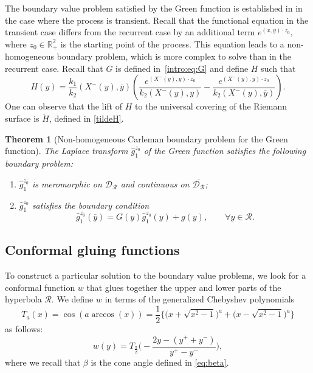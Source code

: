 \documentclass[11pt]{article}
\newcommand\citeS[1]{\cite{#1}}
\newcommand{\R}{\mathcal{R}}
\newcommand{\G}{\mathcal{D}_\mathcal{R}}
\newtheorem{theorem}[thm]{Theorem}
\theoremstyle{definition}
\begin{document}
The boundary value problem satisfied by the Green function is established in \citeS{franceschi_green_2021} in the case where the process is transient. 
Recall that the functional equation in the transient case
differs from the recurrent case by an additional term $e^{(x,y) \cdot z_0}$, where $z_0\in\mathbb{R}_+^2$ is the starting point of the process.
This equation leads to a non-homogeneous boundary problem, which is more complex to solve than in the recurrent case. 
Recall that $G$ is defined in~\eqref{intro:eq:G}
and define $H$ such that
$$
H(y)=
\frac{k_1}{k_2} {(X^-(y),\overline{y})}
\left(
\frac{e^{(X^-(y),y) \cdot z_0}}{k_2(X^-(y),y)}
-
\frac{e^{(X^-(y),\overline{y})\cdot z_0}}{k_2(X^-(y),\overline{y})}
\right) .
$$
One can observe that the lift of $H$ to the universal covering of the Riemann surface is $\widetilde H$, defined in \eqref{tildeH}.
\begin{theorem}[Non-homogeneous Carleman boundary problem for the Green function]
The Laplace transform $\widehat g_1^{z_0}$ of the Green function satisfies the following boundary problem:
\begin{enumerate}[label={\rm (\roman{*})},ref={\rm (\roman{*})}]
\item $\widehat g_1^{z_0}$ is meromorphic on $\G$ and continuous on $\overline{\G}$;
     \item $\widehat g_1^{z_0}$ satisfies the boundary condition
\begin{equation*}
     \widehat g_1^{z_0}(\overline{y})=G(y)\widehat g_1^{z_0}({y}) + g(y), \qquad \forall y\in \mathcal{R}.
\end{equation*}
\end{enumerate}
\end{theorem}

\subsection{Conformal gluing functions}

To construct a particular solution to the boundary value problems, we look for a conformal function $w$ that glues together the upper and lower parts of the hyperbola $\R$.
We define $w$ in terms of the generalized Chebyshev polynomials
\begin{equation*}
T_a(x)  =\cos (a\arccos (x))=\frac{1}{2} \Big\{\big(x+\sqrt{x^2-1}\big)^a+\big(x-\sqrt{x^2-1}\big)^a\Big\}
\end{equation*} as follows:
\begin{equation}
\label{eq:expression_CGF_BM1}
     {w} (y)=T_{\frac{\pi}{\beta}}\bigg(-\frac{2y-(y^++y^-)}{y^+-y^-}\bigg),
\end{equation}
where we recall that
$\beta$
is the cone angle defined in \eqref{eq:beta}.
\end{document}
